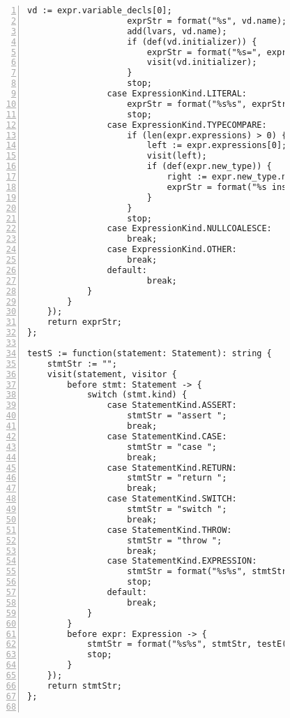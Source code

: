 \begin{figure}[ht!]
\begin{lstlisting}[numbers=left, tabsize=4, escapechar=@, caption={API Usage Mining Analysis},label={lst:aun-code}, lastline = 10]
                    vd := expr.variable_decls[0];
                    exprStr = format("%s", vd.name);
                    add(lvars, vd.name);
                    if (def(vd.initializer)) {
                        exprStr = format("%s=", exprStr);
                        visit(vd.initializer);
                    }
                    stop;
                case ExpressionKind.LITERAL:
                    exprStr = format("%s%s", exprStr, expr.literal);
                    stop;
                case ExpressionKind.TYPECOMPARE:
                    if (len(expr.expressions) > 0) {
                        left := expr.expressions[0];
                        visit(left);
                        if (def(expr.new_type)) {
                            right := expr.new_type.name;
                            exprStr = format("%s instanceof %s", exprStr, right);
                        }
                    }
                    stop;
                case ExpressionKind.NULLCOALESCE:
                    break;
                case ExpressionKind.OTHER:
                    break;
                default:    
                        break;
            }
        }
    });
    return exprStr;
};

testS := function(statement: Statement): string {
    stmtStr := "";
    visit(statement, visitor {
        before stmt: Statement -> {
            switch (stmt.kind) {
                case StatementKind.ASSERT:
                    stmtStr = "assert ";
                    break;
                case StatementKind.CASE:
                    stmtStr = "case ";
                    break;
                case StatementKind.RETURN:
                    stmtStr = "return ";
                    break;
                case StatementKind.SWITCH:
                    stmtStr = "switch ";
                    break;
                case StatementKind.THROW:
                    stmtStr = "throw ";
                    break;
                case StatementKind.EXPRESSION:
                    stmtStr = format("%s%s", stmtStr, testE(stmt.expression));
                    stop;
                default:    
                    break;
            }
        }
        before expr: Expression -> {
            stmtStr = format("%s%s", stmtStr, testE(expr));    
            stop;
        }
    });
    return stmtStr;
};


\end{lstlisting}
\end{figure}
